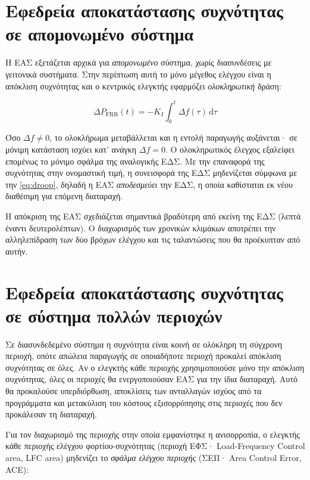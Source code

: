 \section{Εφεδρεία αποκατάστασης συχνότητας σε απομονωμένο σύστημα}
\label{sec:frr-single}

Η ΕΑΣ εξετάζεται αρχικά για \emph{απομονωμένο} σύστημα, χωρίς διασυνδέσεις με γειτονικά
συστήματα. Στην περίπτωση αυτή το μόνο μέγεθος ελέγχου είναι η απόκλιση συχνότητας και ο
κεντρικός ελεγκτής εφαρμόζει \emph{ολοκληρωτική} δράση:

\begin{equation}
\Delta P_{\mathrm{FRR}}(t) = -K_I \int_0^{t} \Delta f(\tau)\,\mathrm{d}\tau
\label{eq:frr-isolated}
\end{equation}

Όσο $\Delta f \neq 0$, το ολοκλήρωμα μεταβάλλεται και η εντολή παραγωγής αυξάνεται· σε μόνιμη
κατάσταση ισχύει κατ' ανάγκη $\Delta f = 0$. Ο ολοκληρωτικός έλεγχος εξαλείφει επομένως το
μόνιμο σφάλμα της αναλογικής ΕΔΣ. Με την επαναφορά της συχνότητας στην ονομαστική τιμή, η
συνεισφορά της ΕΔΣ μηδενίζεται σύμφωνα με την \eqref{eq:droop}, δηλαδή η ΕΑΣ
\emph{αποδεσμεύει} την ΕΔΣ, η οποία καθίσταται εκ νέου διαθέσιμη για επόμενη διαταραχή.

Η απόκριση της ΕΑΣ σχεδιάζεται σημαντικά βραδύτερη από εκείνη της ΕΔΣ (λεπτά έναντι
δευτερολέπτων). Ο διαχωρισμός των χρονικών κλιμάκων αποτρέπει την αλληλεπίδραση των δύο
βρόχων ελέγχου και τις ταλαντώσεις που θα προέκυπταν από αυτήν.

\section{Εφεδρεία αποκατάστασης συχνότητας σε σύστημα πολλών περιοχών}
\label{sec:frr-multi}

Σε διασυνδεδεμένο σύστημα η συχνότητα είναι κοινή σε ολόκληρη τη σύγχρονη περιοχή,
οπότε απώλεια παραγωγής σε οποιαδήποτε περιοχή προκαλεί απόκλιση συχνότητας σε όλες. Αν ο
ελεγκτής κάθε περιοχής χρησιμοποιούσε μόνο την απόκλιση συχνότητας, όλες οι περιοχές θα
ενεργοποιούσαν ΕΑΣ για την ίδια διαταραχή. Αυτό θα προκαλούσε υπερδιόρθωση, αποκλίσεις των
ανταλλαγών ισχύος από τα προγράμματα και μετακύλιση του κόστους εξισορρόπησης στις περιοχές
που δεν προκάλεσαν τη διαταραχή.

Για τον διαχωρισμό της περιοχής στην οποία εμφανίστηκε η ανισορροπία, ο ελεγκτής κάθε
περιοχής ελέγχου φορτίου-συχνότητας (περιοχή ΕΦΣ· Load-Frequency Control area, LFC area) μηδενίζει το \emph{σφάλμα ελέγχου
περιοχής} (ΣΕΠ· Area Control Error, ACE):

